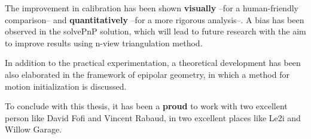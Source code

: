 The improvement in calibration has been shown \textbf{visually} --for a human-friendly comparison-- and \textbf{quantitatively} --for a more rigorous analysis--. A bias has been observed in the solvePnP solution, which will lead to future research with the aim to improve results using n-view triangulation method. %

In addition to the practical experimentation, a theoretical development has been also elaborated in the framework of epipolar geometry, in which a method for motion initialization is discussed.


To conclude with this thesis, it has been a \textbf{proud} to work with two excellent person like David Fofi and Vincent Rabaud, in two excellent places like Le2i and Willow Garage.
